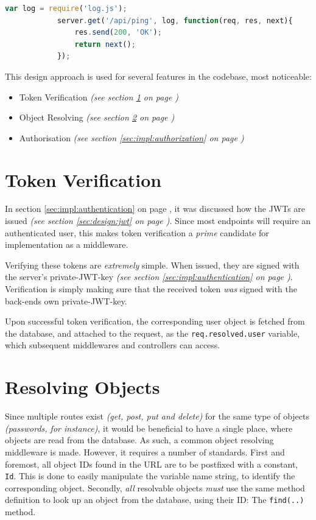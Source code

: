 		\begin{lstlisting}[gobble=12,language=JavaScript,caption={Ping endpoint with the log middleware},label={lst:example:ping_wlog}]
            var log = require('log.js');
            server.get('/api/ping', log, function(req, res, next){
                res.send(200, 'OK');
                return next();
            });		
		\end{lstlisting}

		This design approach is used for several features in the codebase, most noticeable:
		\begin{itemize}
			\item Token Verification \emph{(see section \ref{sec:impl:token-verification} on page \pageref{sec:impl:token-verification})}
			\item Object Resolving \emph{(see section \ref{sec:impl:resolve} on page \pageref{sec:impl:resolve})}
			\item Authorisation \emph{(see section \ref{sec:impl:authorization} on page \pageref{sec:impl:authorization})}
		\end{itemize}

	\section{Token Verification}
		\label{sec:impl:token-verification}
		In section \ref{sec:impl:authentication} on page \pageref{sec:impl:authentication}, it was discussed how the JWTs are issued \emph{(see section \ref{sec:design:jwt} on page \pageref{sec:design:jwt})}. Since most endpoints will require an authenticated user, this makes token verification a \emph{prime} candidate for implementation as a middleware.

		Verifying these tokens are \emph{extremely} simple. When issued, they are signed with the server's private-JWT-key \emph{(see section \ref{sec:impl:authentication} on page \pageref{sec:impl:authentication})}. Verification is simply making sure that the received token \emph{was} signed with the back-ends own private-JWT-key.

		Upon successful token verification, the corresponding user object is fetched from the database, and attached to the request, as the \verb=req.resolved.user= variable, which subsequent middlewares and controllers can access. 

	\section{Resolving Objects}
		\label{sec:impl:resolve}
		Since multiple routes exist \emph{(get, post, put and delete)} for the same type of objects \emph{(passwords, for instance)}, it would be beneficial to have a single place, where objects are read from the database. As such, a common object resolving middleware is made. However, it requires a number of standards. First and foremost, all object IDs found in the URL are to be postfixed with a constant, \verb=Id=. This is done to easily manipulate the variable name string, to identify the corresponding object. Secondly, \emph{all} resolvable objects \emph{must} use the same method definition to look up an object from the database, using their ID: The \verb=find(..)= method.

